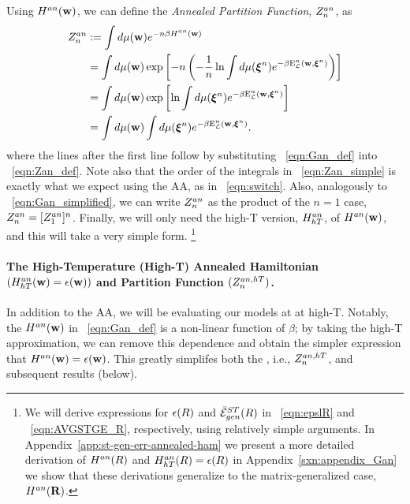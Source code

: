 Using $H^{an}({\mathbf{w}})$, we can define the \emph{Annealed Partition Function}, $Z^{an}_{n}$, as
\begin{align}
  \label{eqn:Zan_def}
  Z^{an}_{n} 
  &:=  \int d\mu({\mathbf{w}}) e^{-n\beta H^{an}({\mathbf{w}})} \nonumber \\
  &=\int d\mu({\mathbf{w}}) \exp\left[-n \left(- \frac{1}{n}\ln  \int d\mu(\boldsymbol{\xi}^{n})e^{-\beta\mathbf{\mathrm{E}}^{n}_{\mathcal{L}}(\mathbf{w}, \boldsymbol{\xi}^{n})}\right)\right] \nonumber \\
  &=  \int d\mu({\mathbf{w}}) \exp\left[\ln  \int d\mu(\boldsymbol{\xi}^{n})e^{-\beta\mathbf{\mathrm{E}}^{n}_{\mathcal{L}}(\mathbf{w}, \boldsymbol{\xi}^{n})}\right] \\ 
  \label{eqn:Zan_simple}
  &=  \int d\mu({\mathbf{w}})  \int d\mu(\boldsymbol{\xi}^{n})e^{-\beta\mathbf{\mathrm{E}}^{n}_{\mathcal{L}}(\mathbf{w}, \boldsymbol{\xi}^{n})} .
\end{align}
where the lines after the first line follow by substituting \EQN~\ref{eqn:Gan_def} into \EQN~\ref{eqn:Zan_def}.
Note also that the order of the integrals in \EQN~\ref{eqn:Zan_simple} is exactly what we expect using the AA, as in \EQN~\ref{eqn:switch}.
Also, analogously to \EQN~\ref{eqn:Gan_simplified}, we can write $Z^{an}_{n}$ as the product of the $n=1$ case, $Z^{an}_{n}=[Z^{an}_{1}]^{n}$.
Finally, we will only need the high-T version, $H^{an}_{hT}$, of $H^{an}({\mathbf{w}})$, and this will take a very simple form.
\footnote{We will derive expressions for $\epsilon(R)$ and $\bar{\mathcal{E}}^{ST}_{gen}(R)$ in \EQN~\ref{eqn:epslR} and \EQN~\ref{eqn:AVGSTGE_R}, respectively, using relatively simple arguments.
In Appendix~\ref{app:st-gen-err-annealed-ham} we present
a more detailed derivation of $H^{an}(R)$ and $H^{an}_{hT}(R)=\epsilon(R)$
in Appendix~\ref{sxn:appendix_Gan} we show that these derivations generalize to the matrix-generalized case, $H^{an}(\mathbf{R})$.}


\paragraph{The High-Temperature (High-T) Annealed Hamiltonian $(H^{an}_{hT}({\mathbf{w}})=\epsilon({\mathbf{w}}))$ and Partition Function $(Z^{an,hT}_{n})$. }
In addition to the AA, we will be evaluating our models at at high-T.
Notably, the \AnnealedHamiltonian $H^{an}({\mathbf{w}})$ in \EQN~\ref{eqn:Gan_def} is a non-linear function of $\beta$; by
taking the high-T approximation, we can remove this dependence and obtain
the simpler expression that $H^{an}({\mathbf{w}})=\epsilon({\mathbf{w}})$.  This greatly simplifes both
the \PartitionFunction, i.e.,  $Z^{an,hT}_{n}$, and subsequent results (below).

